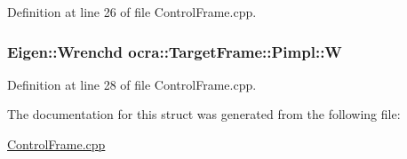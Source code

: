 Definition at line 26 of file Control\+Frame.\+cpp.

\subsubsection[{\texorpdfstring{W}{W}}]{\setlength{\rightskip}{0pt plus 5cm}Eigen\+::\+Wrenchd ocra\+::\+Target\+Frame\+::\+Pimpl\+::W}\hypertarget{structocra_1_1TargetFrame_1_1Pimpl_a4ff4bfb5366d48f34539e73fa7b18351}{}\label{structocra_1_1TargetFrame_1_1Pimpl_a4ff4bfb5366d48f34539e73fa7b18351}


Definition at line 28 of file Control\+Frame.\+cpp.



The documentation for this struct was generated from the following file\+:\begin{DoxyCompactItemize}
\item 
\hyperlink{ControlFrame_8cpp}{Control\+Frame.\+cpp}\end{DoxyCompactItemize}
